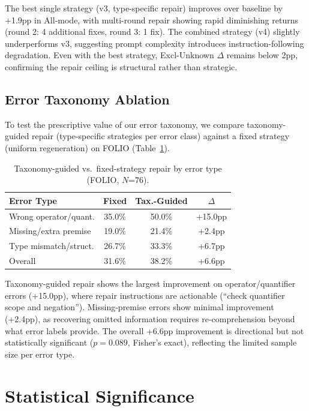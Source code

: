 \documentclass[11pt,a4paper]{article}
\begin{document}
The best single strategy (v3, type-specific repair) improves over baseline by +1.9pp in All-mode, with multi-round repair showing rapid diminishing returns (round 2: 4 additional fixes, round 3: 1 fix). The combined strategy (v4) slightly underperforms v3, suggesting prompt complexity introduces instruction-following degradation. Even with the best strategy, Excl-Unknown $\Delta$ remains below 2pp, confirming the repair ceiling is structural rather than strategic.

\subsection{Error Taxonomy Ablation}
\label{sec:taxonomy-ablation}

To test the prescriptive value of our error taxonomy, we compare taxonomy-guided repair (type-specific strategies per error class) against a fixed strategy (uniform regeneration) on FOLIO (Table~\ref{tab:taxonomy-ablation}).

\begin{table}[t]
\centering
\small
\caption{Taxonomy-guided vs.\ fixed-strategy repair by error type (FOLIO, $N$=76).}
\label{tab:taxonomy-ablation}
\begin{tabular}{lccc}
\toprule
\textbf{Error Type} & \textbf{Fixed} & \textbf{Tax.-Guided} & \textbf{$\Delta$} \\
\midrule
Wrong operator/quant. & 35.0\% & 50.0\% & +15.0pp \\
Missing/extra premise & 19.0\% & 21.4\% & +2.4pp \\
Type mismatch/struct. & 26.7\% & 33.3\% & +6.7pp \\
\midrule
Overall & 31.6\% & 38.2\% & +6.6pp \\
\bottomrule
\end{tabular}
\end{table}

Taxonomy-guided repair shows the largest improvement on operator/quantifier errors (+15.0pp), where repair instructions are actionable (``check quantifier scope and negation''). Missing-premise errors show minimal improvement (+2.4pp), as recovering omitted information requires re-comprehension beyond what error labels provide. The overall +6.6pp improvement is directional but not statistically significant ($p=0.089$, Fisher's exact), reflecting the limited sample size per error type.

\section{Statistical Significance}
\label{sec:stats}
\end{document}
